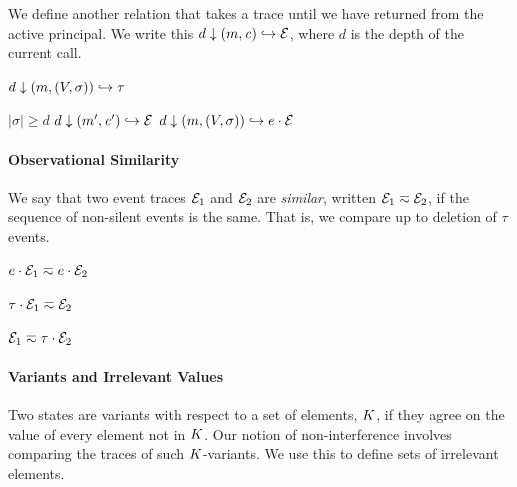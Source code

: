\documentclass[10pt,conference]{ieeetran}%
\theoremstyle{definition}
\begin{document}
We define another relation that takes a trace until we have returned from the
active principal.
We write this \(d \downarrow (m,\mathit{c}) \hookrightarrow \mathcal{E}\), where
\(d\) is the depth of the current call.

         {\(d \downarrow (m,(V,\sigma)) \hookrightarrow \tau\)}

                  {\(|\sigma| \geq d\)}
                  {\(d \downarrow (m',\mathit{c}') \hookrightarrow \mathcal{E}\)}
                  {\(d \downarrow (m,(V,\sigma)) \hookrightarrow e \cdot \mathcal{E}\)}

\paragraph*{Observational Similarity}

We say that two event traces $\mathcal{E}_1$ and $\mathcal{E}_2$ are {\em similar},
written \(\mathcal{E}_1 \eqsim \mathcal{E}_2\), if the sequence of non-silent events
is the same. That is, we compare up to deletion of \(\tau\) events.

\begin{minipage}{.4\columnwidth}
  \judgment{}{\(\obsT \eqsim \obsT\)}
\end{minipage}
\begin{minipage}{.4\columnwidth}
           {\(e \cdot \mathcal{E}_1 \eqsim e \cdot \mathcal{E}_2\)}
\end{minipage}

\begin{minipage}{.4\columnwidth}
           {\(\tau \cdot \mathcal{E}_1 \eqsim \mathcal{E}_2\)}
\end{minipage}
\begin{minipage}{.4\columnwidth}
           {\(\mathcal{E}_1 \eqsim \tau \cdot \mathcal{E}_2\)}
\end{minipage}

\paragraph*{Variants and Irrelevant Values}

Two states are variants with respect to a set of elements, \(K\),
if they agree on the value of every element not in \(K\). Our
notion of non-interference involves comparing the traces of such
\(K\)-variants. We use this to define sets of irrelevant elements.
\end{document}
